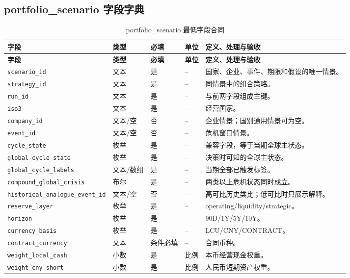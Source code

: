 \documentclass[UTF8,fontset=windows,12pt,openany]{ctexbook}
\newcommand{\Field}[1]{{\small\nolinkurl{#1}}}
\begin{document}
\clearpage
\begin{landscape}
\chapter{portfolio\_scenario 字段字典}
\begin{longtable}{p{4.0cm}p{2.2cm}p{2.2cm}p{2.5cm}p{7.4cm}}
\caption{portfolio\_scenario 最低字段合同}\label{tab:dict-portfolio}\\
\toprule
\textbf{字段} & \textbf{类型} & \textbf{必填} & \textbf{单位} & \textbf{定义、处理与验收}\\
\midrule
\endfirsthead
\toprule \textbf{字段} & \textbf{类型} & \textbf{必填} & \textbf{单位} & \textbf{定义、处理与验收}\\ \midrule
\endhead
\Field{scenario_id} & 文本 & 是 & -- & 国家、企业、事件、期限和假设的唯一情景。\\
\Field{strategy_id} & 文本 & 是 & -- & 同情景中的组合策略。\\
\Field{run_id} & 文本 & 是 & -- & 与前两字段组成主键。\\
\Field{iso3} & 文本 & 是 & -- & 经营国家。\\
\Field{company_id} & 文本/空 & 否 & -- & 企业情景；国别通用情景可为空。\\
\Field{event_id} & 文本/空 & 否 & -- & 危机窗口情景。\\
\Field{cycle_state} & 枚举 & 是 & -- & 兼容字段，等于当期全球主状态。\\
\Field{global_cycle_state} & 枚举 & 是 & -- & 决策时可知的全球主状态。\\
\Field{global_cycle_labels} & 文本/数组 & 是 & -- & 当期全部已触发标签。\\
\Field{compound_global_crisis} & 布尔 & 是 & -- & 两类以上危机状态同时成立。\\
\Field{historical_analogue_event_id} & 文本/空 & 否 & -- & 高可比历史类比；低可比时只展示解释。\\
\Field{reserve_layer} & 枚举 & 是 & -- & operating/liquidity/strategic。\\
\Field{horizon} & 枚举 & 是 & -- & 90D/1Y/5Y/10Y。\\
\Field{currency_basis} & 枚举 & 是 & -- & LCU/CNY/CONTRACT。\\
\Field{contract_currency} & 文本 & 条件必填 & -- & 合同币种。\\
\Field{weight_local_cash} & 小数 & 是 & 比例 & 本币经营现金权重。\\
\Field{weight_cny_short} & 小数 & 是 & 比例 & 人民币短期资产权重。\\

\end{longtable}
\end{landscape}
\end{document}
